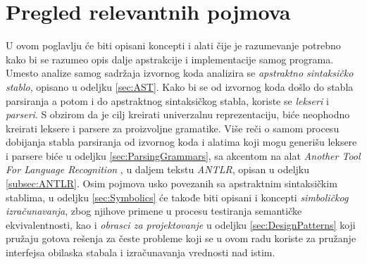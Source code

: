 \chapter{Pregled relevantnih pojmova}
\label{chp:RelevantTerms}

U ovom poglavlju će biti opisani koncepti i alati čije je razumevanje potrebno kako bi se razumeo opis dalje apstrakcije i implementacije samog programa. Umesto analize samog sadržaja izvornog koda analizira se \emph{apstraktno sintaksičko stablo}, opisano u odeljku \ref{sec:AST}. Kako bi se od izvornog koda došlo do stabla parsiranja a potom i do apstraktnog sintaksičkog stabla, koriste se \emph{lekseri} i \emph{parseri}. S obzirom da je cilj kreirati univerzalnu reprezentaciju, biće neophodno kreirati leksere i parsere za proizvoljne gramatike. Više reči o samom procesu dobijanja stabla parsiranja od izvornog koda i alatima koji mogu generišu leksere i parsere biće u odeljku \ref{sec:ParsingGrammars}, sa akcentom na alat \emph{Another Tool For Language Recognition} \cite{ANTLR}, u daljem tekstu \emph{ANTLR}, opisan u odeljku \ref{subsec:ANTLR}. Osim pojmova usko povezanih sa apstraktnim sintaksičkim stablima, u odeljku \ref{sec:Symbolics} će takođe biti opisani i koncepti \emph{simboličkog izračunavanja}, zbog njihove primene u procesu testiranja semantičke ekvivalentnosti, kao i \emph{obrasci za projektovanje} u odeljku \ref{sec:DesignPatterns} koji pružaju gotova rešenja za česte probleme koji se u ovom radu koriste za pružanje interfejsa obilaska stabala i izračunavanja vrednosti nad istim.





